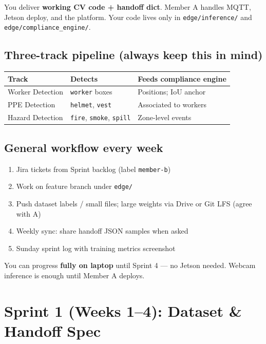 \documentclass[12pt,a4paper]{report}
\begin{document}
You deliver \textbf{working CV code + handoff dict}. Member A handles MQTT, Jetson deploy, and the platform. Your code lives only in \texttt{edge/inference/} and \texttt{edge/compliance\_engine/}.

\section{Three-track pipeline (always keep this in mind)}

\begin{center}
\begin{tabular}{lll}
\toprule
\textbf{Track} & \textbf{Detects} & \textbf{Feeds compliance engine} \\
\midrule
Worker Detection & \texttt{worker} boxes & Positions; IoU anchor \\
PPE Detection & \texttt{helmet}, \texttt{vest} & Associated to workers \\
Hazard Detection & \texttt{fire}, \texttt{smoke}, \texttt{spill} & Zone-level events \\
\bottomrule
\end{tabular}
\end{center}

\section{General workflow every week}

\begin{enumerate}
    \item Jira tickets from Sprint backlog (label \texttt{member-b})
    \item Work on feature branch under \texttt{edge/}
    \item Push dataset labels / small files; large weights via Drive or Git LFS (agree with A)
    \item Weekly sync: share handoff JSON samples when asked
    \item Sunday sprint log with training metrics screenshot
\end{enumerate}

\begin{tipbox}
You can progress \textbf{fully on laptop} until Sprint 4 --- no Jetson needed. Webcam inference is enough until Member A deploys.
\end{tipbox}

\chapter{Sprint 1 (Weeks 1--4): Dataset \& Handoff Spec}
\end{document}

